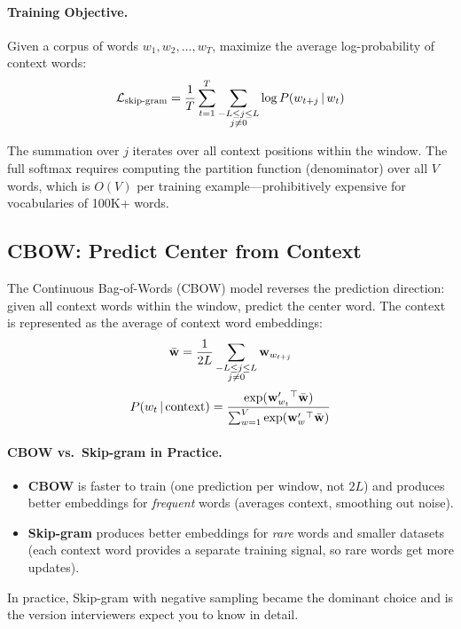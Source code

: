 \paragraph{Training Objective.}
Given a corpus of words $w_1, w_2, \ldots, w_T$, maximize the average
log-probability of context words:
\[
    \mathcal{L}_{\text{skip-gram}}
    = \frac{1}{T} \sum_{t=1}^{T}
      \sum_{\substack{-L \leq j \leq L \\ j \neq 0}}
      \log P(w_{t+j} \,|\, w_t)
\]

The summation over $j$ iterates over all context positions within the window.
The full softmax requires computing the partition function (denominator) over
all $V$ words, which is $O(V)$ per training example---prohibitively expensive
for vocabularies of 100K+ words.

\subsection{CBOW: Predict Center from Context}

The Continuous Bag-of-Words (CBOW) model reverses the prediction direction:
given all context words within the window, predict the center word.  The
context is represented as the average of context word embeddings:
\[
    \bar{\mathbf{w}} = \frac{1}{2L} \sum_{\substack{-L \leq j \leq L \\ j \neq 0}}
                \mathbf{w}_{w_{t+j}}
\]
\[
    P(w_t \,|\, \text{context})
    = \frac{\exp(\mathbf{w}'_{w_t}{}^\top \bar{\mathbf{w}})}
           {\sum_{w=1}^{V} \exp(\mathbf{w}'_w{}^\top \bar{\mathbf{w}})}
\]

\paragraph{CBOW vs.\ Skip-gram in Practice.}
\begin{itemize}
    \item \textbf{CBOW} is faster to train (one prediction per window, not
    $2L$) and produces better embeddings for \emph{frequent} words (averages
    context, smoothing out noise).
    \item \textbf{Skip-gram} produces better embeddings for \emph{rare} words
    and smaller datasets (each context word provides a separate training
    signal, so rare words get more updates).
\end{itemize}

In practice, Skip-gram with negative sampling became the dominant choice and
is the version interviewers expect you to know in detail.

